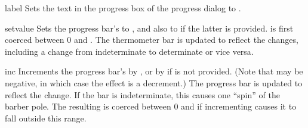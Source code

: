 \begin{methoddesc}[ProgressBar]{label}{}
Sets the text in the progress box of the progress dialog to
.
\end{methoddesc}

\begin{methoddesc}[ProgressBar]{set}{value}
Sets the progress bar's  to , and also
 to  if the latter is provided.  
is first coerced between 0 and .  The thermometer bar
is updated to reflect the changes, including a change from
indeterminate to determinate or vice versa.
\end{methoddesc}

\begin{methoddesc}[ProgressBar]{inc}{}
Increments the progress bar's  by , or by 
if  is not provided.  (Note that  may be negative, in
which case the effect is a decrement.)  The progress bar is updated to
reflect the change.  If the bar is indeterminate, this causes one
``spin'' of the barber pole.  The resulting  is coerced
between 0 and  if incrementing causes it to fall
outside this range.
\end{methoddesc}

